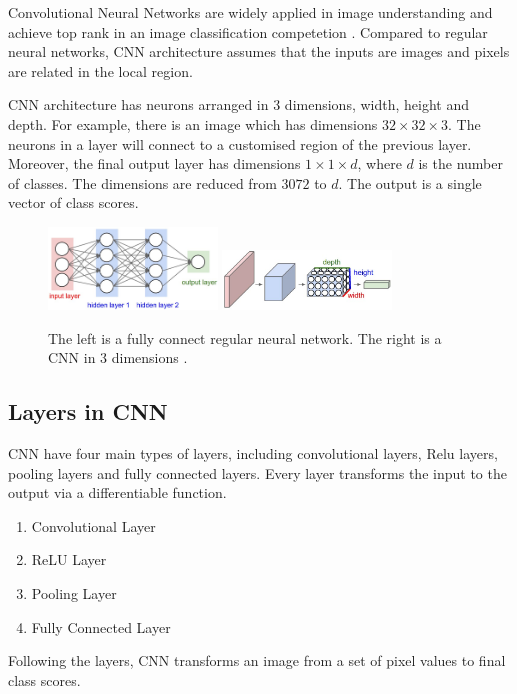 Convolutional Neural Networks \citep{lecun1998gradient} are widely applied in image understanding and achieve top rank in an image classification competetion \citep{krizhevsky2012imagenet}. Compared to regular neural networks, CNN architecture assumes that the inputs are images and pixels are related in the local region.

CNN architecture has neurons arranged in 3 dimensions, width, height and depth. For example, there is an image which has dimensions $32\times 32\times 3$. The neurons in a layer will connect to a customised region of the previous layer. Moreover, the final output layer has dimensions $1\times 1\times d$, where $d$ is the number of classes. The dimensions are reduced from $3072$ to $d$. The output is a single vector of class scores.

\graphicspath{ {./Figures/} }
\begin{figure}[!htb]
\centering
\includegraphics[width=0.4\textwidth]{neural_net2.jpeg}
\includegraphics[width=0.4\textwidth]{cnn.jpeg}
\caption{\label{fig:compareCNNandFC}The left is a fully connect regular neural network. The right is a CNN in 3 dimensions \citep{CNNDiagram}.}
\end{figure}

\subsection{Layers in CNN}
CNN have four main types of layers, including convolutional layers, Relu layers, pooling layers and fully connected layers. Every layer transforms the input to the output via a differentiable function. 
\begin{enumerate}
  \item Convolutional Layer
  \item ReLU Layer
  \item Pooling Layer
  \item Fully Connected Layer
\end{enumerate}
Following the layers, CNN transforms an image from a set of pixel values to final class scores.

